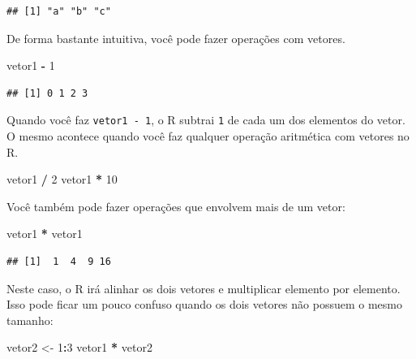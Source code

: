 \documentclass[
]{book}
\newenvironment{Shaded}{\begin{snugshade}}{\end{snugshade}}
\newcommand{\DecValTok}[1]{\textcolor[rgb]{0.00,0.00,0.81}{#1}}
\newcommand{\NormalTok}[1]{#1}
\newcommand{\OperatorTok}[1]{\textcolor[rgb]{0.81,0.36,0.00}{\textbf{#1}}}
\newcommand{\StringTok}[1]{\textcolor[rgb]{0.31,0.60,0.02}{#1}}
\begin{document}
\begin{verbatim}
## [1] "a" "b" "c"
\end{verbatim}

De forma bastante intuitiva, você pode fazer operações com vetores.

\begin{Shaded}
\begin{Highlighting}[]
\NormalTok{vetor1 }\OperatorTok{{-}}\StringTok{ }\DecValTok{1}
\end{Highlighting}
\end{Shaded}

\begin{verbatim}
## [1] 0 1 2 3
\end{verbatim}

Quando você faz \texttt{vetor1\ -\ 1}, o R subtrai \texttt{1} de cada um dos elementos do vetor. O mesmo acontece quando você faz qualquer operação aritmética com vetores no R.

\begin{Shaded}
\begin{Highlighting}[]
\NormalTok{vetor1 }\OperatorTok{/}\StringTok{ }\DecValTok{2}
\NormalTok{vetor1 }\OperatorTok{*}\StringTok{ }\DecValTok{10}
\end{Highlighting}
\end{Shaded}

Você também pode fazer operações que envolvem mais de um vetor:

\begin{Shaded}
\begin{Highlighting}[]
\NormalTok{vetor1 }\OperatorTok{*}\StringTok{ }\NormalTok{vetor1}
\end{Highlighting}
\end{Shaded}

\begin{verbatim}
## [1]  1  4  9 16
\end{verbatim}

Neste caso, o R irá alinhar os dois vetores e multiplicar elemento por elemento. Isso pode ficar um pouco confuso quando os dois vetores não possuem o mesmo tamanho:

\begin{Shaded}
\begin{Highlighting}[]
\NormalTok{vetor2 <{-}}\StringTok{ }\DecValTok{1}\OperatorTok{:}\DecValTok{3}
\NormalTok{vetor1 }\OperatorTok{*}\StringTok{ }\NormalTok{vetor2}
\end{Highlighting}
\end{Shaded}
\end{document}
